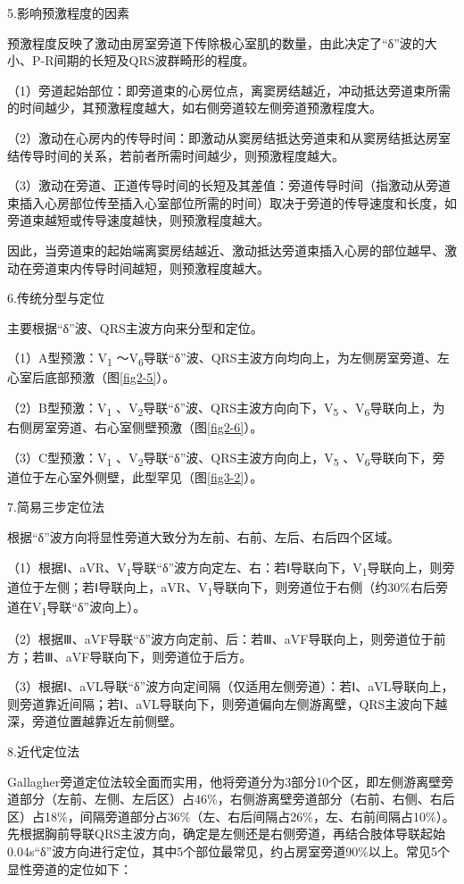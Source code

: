 5.影响预激程度的因素

预激程度反映了激动由房室旁道下传除极心室肌的数量，由此决定了“δ”波的大小、P-R间期的长短及QRS波群畸形的程度。

（1）旁道起始部位：即旁道束的心房位点，离窦房结越近，冲动抵达旁道束所需的时间越少，其预激程度越大，如右侧旁道较左侧旁道预激程度大。

（2）激动在心房内的传导时间：即激动从窦房结抵达旁道束和从窦房结抵达房室结传导时间的关系，若前者所需时间越少，则预激程度越大。

（3）激动在旁道、正道传导时间的长短及其差值：旁道传导时间（指激动从旁道束插入心房部位传至插入心室部位所需的时间）取决于旁道的传导速度和长度，如旁道束越短或传导速度越快，则预激程度越大。

因此，当旁道束的起始端离窦房结越近、激动抵达旁道束插入心房的部位越早、激动在旁道束内传导时间越短，则预激程度越大。

6.传统分型与定位

主要根据“δ”波、QRS主波方向来分型和定位。

（1）A型预激：V\textsubscript{1} ～V\textsubscript{6}导联“δ”波、QRS主波方向均向上，为左侧房室旁道、左心室后底部预激（图\ref{fig2-5}）。

（2）B型预激：V\textsubscript{1} 、V\textsubscript{2}导联“δ”波、QRS主波方向向下，V\textsubscript{5} 、V\textsubscript{6}导联向上，为右侧房室旁道、右心室侧壁预激（图\ref{fig2-6}）。

（3）C型预激：V\textsubscript{1} 、V\textsubscript{2}导联“δ”波、QRS主波方向向上，V\textsubscript{5} 、V\textsubscript{6}导联向下，旁道位于左心室外侧壁，此型罕见（图\ref{fig3-2}）。

7.简易三步定位法

根据“δ”波方向将显性旁道大致分为左前、右前、左后、右后四个区域。

（1）根据Ⅰ、aVR、V\textsubscript{1}导联“δ”波方向定左、右：若Ⅰ导联向下，V\textsubscript{1}导联向上，则旁道位于左侧；若Ⅰ导联向上，aVR、V\textsubscript{1}导联向下，则旁道位于右侧（约30\%右后旁道在V\textsubscript{1}导联“δ”波向上）。

（2）根据Ⅲ、aVF导联“δ”波方向定前、后：若Ⅲ、aVF导联向上，则旁道位于前方；若Ⅲ、aVF导联向下，则旁道位于后方。

（3）根据Ⅰ、aVL导联“δ”波方向定间隔（仅适用左侧旁道）：若Ⅰ、aVL导联向上，则旁道靠近间隔；若Ⅰ、aVL导联向下，则旁道偏向左侧游离壁，QRS主波向下越深，旁道位置越靠近左前侧壁。

8.近代定位法

Gallagher旁道定位法较全面而实用，他将旁道分为3部分10个区，即左侧游离壁旁道部分（左前、左侧、左后区）占46\%，右侧游离壁旁道部分（右前、右侧、右后区）占18\%，间隔旁道部分占36\%（左、右后间隔占26\%，左、右前间隔占10\%）。先根据胸前导联QRS主波方向，确定是左侧还是右侧旁道，再结合肢体导联起始0.04s“δ”波方向进行定位，其中5个部位最常见，约占房室旁道90\%以上。常见5个显性旁道的定位如下：

